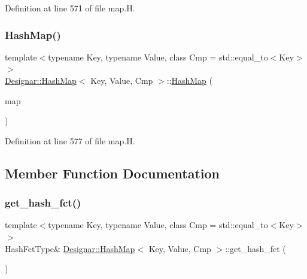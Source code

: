Definition at line 571 of file map.\+H.

\mbox{\label{class_designar_1_1_hash_map_a16d4d99bb19bd91ea5700d46d188684b}} 
\subsubsection{\texorpdfstring{Hash\+Map()}{HashMap()}\hspace{0.1cm}{\footnotesize\ttfamily [7/7]}}
{\footnotesize\ttfamily template$<$typename Key, typename Value, class Cmp = std\+::equal\+\_\+to$<$\+Key$>$$>$ \\
\hyperlink{class_designar_1_1_hash_map}{Designar\+::\+Hash\+Map}$<$ Key, Value, Cmp $>$\+::\hyperlink{class_designar_1_1_hash_map}{Hash\+Map} (\begin{DoxyParamCaption}\item[{\hyperlink{class_designar_1_1_hash_map}{Hash\+Map}$<$ Key, Value, Cmp $>$ \&\&}]{map }\end{DoxyParamCaption})\hspace{0.3cm}{\ttfamily [inline]}}



Definition at line 577 of file map.\+H.



\subsection{Member Function Documentation}
\mbox{\label{class_designar_1_1_hash_map_abcb9cdbb25c6d35f0f0373011265d570}} 
\subsubsection{\texorpdfstring{get\+\_\+hash\+\_\+fct()}{get\_hash\_fct()}\hspace{0.1cm}{\footnotesize\ttfamily [1/2]}}
{\footnotesize\ttfamily template$<$typename Key, typename Value, class Cmp = std\+::equal\+\_\+to$<$\+Key$>$$>$ \\
Hash\+Fct\+Type\& \hyperlink{class_designar_1_1_hash_map}{Designar\+::\+Hash\+Map}$<$ Key, Value, Cmp $>$\+::get\+\_\+hash\+\_\+fct (\begin{DoxyParamCaption}{ }\end{DoxyParamCaption})\hspace{0.3cm}{\ttfamily [inline]}}



